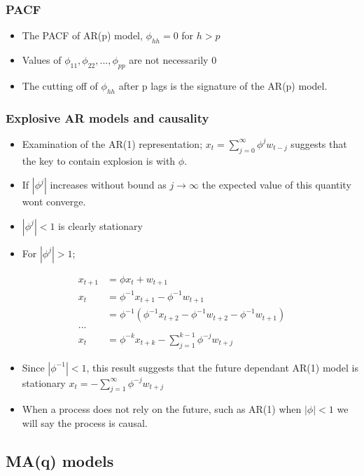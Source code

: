 \documentclass{article}
\begin{document}
\subsubsection{PACF}
\begin{itemize}
    \item The PACF of AR(p) model, $\phi_{hh} = 0$ for $h>p$
    \item Values of $\phi_{11}, \phi_{22}, ..., \phi_{pp}$ are not necessarily 0
    \item The cutting off of $\phi_{hh}$ after p lags is the signature of the AR(p) model.
\end{itemize}


\subsubsection{Explosive AR models and causality}
\begin{itemize}
    \item Examination of the AR(1) representation; $x_t = \sum_{j=0}^\infty \phi^j w_{t-j}$ suggests that the key to contain explosion is with $\phi$.
    \item If $|\phi^j|$ increases without bound as $j \rightarrow \infty$ the expected value of this quantity wont converge.
    \item $|\phi^j| < 1$ is clearly stationary
    \item For $|\phi^j| > 1$;
\end{itemize}
\begin{align*}
    x_{t+1} &= \phi x_t + w_{t+1}\\
    x_t &= \phi^{-1} x_{t+1} - \phi^{-1} w_{t+1}\\
    &= \phi^{-1}(\phi^{-1} x_{t+2} - \phi^{-1}w_{t+2} - \phi^{-1} w_{t+1})\\
    ...&\\
    x_t &=\phi^{-k} x_{t+k} - \sum_{j=1}^{k-1} \phi^{-j} w_{t+j}
\end{align*}
\begin{itemize}
    \item Since $|\phi^{-1}| < 1$, this result suggests that the future dependant AR(1) model is stationary $x_t = -\sum_{j=1}^\infty \phi^{-j} w_{t+j}$
    \item When a process does not rely on the future, such as AR(1) when $|\phi| < 1$ we will say the process is causal.
\end{itemize}

\subsection{MA(q) models}
\end{document}
